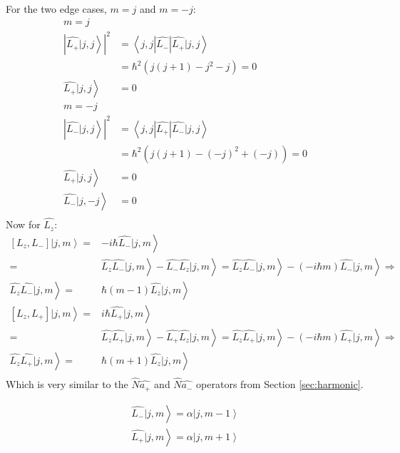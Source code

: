 		For the two edge cases, $m = j$ and $m = -j$:
		\begin{align}
			m = j& \\
			\left| \left. \hat{L_+} | j,j \right\rangle \right|^2 &= \left\langle j,j | \hat{L_-}| \hat{L_+} |j,j \right\rangle \\
			&= \hbar^2 \left( j(j+1) - j^2 - j\right) = 0 \\
			\left. \hat{L_+} | j,j \right\rangle &= 0 \\
			m = -j& \\
			\left| \left. \hat{L_-} | j,j \right\rangle \right|^2 &= \left\langle j,j | \hat{L_+}| \hat{L_-} |j,j \right\rangle \\
			&= \hbar^2 \left( j(j+1) - (-j)^2 + (-j)\right) = 0 \\
			\left. \hat{L_+} | j,j \right\rangle &= 0 \\			
			\left. \hat{L_-} | j,-j \right\rangle &= 0 \\			
		\end{align}
		Now for $\hat{L_z}$:
		\begin{align}
			\left.\left[L_z, L_-\right]|j,m\right\rangle =& \left.-i\hbar\hat{L_-}|j,m\right\rangle \\
			=& \left.\hat{L_z}\hat{L_-}|j,m\right\rangle - \left.\hat{L_-}\hat{L_z}|j,m\right\rangle = \left.\hat{L_z}\hat{L_-}|j,m\right\rangle - \left.(-i\hbar m)\hat{L_-}|j,m\right\rangle \Rightarrow \\
			\left.\hat{L_z}\hat{L_-}|j,m\right\rangle =& \left. \hbar(m-1)\hat{L_z}|j,m\right\rangle \\
			\left.\left[L_z, L_+\right]|j,m\right\rangle =& \left.i\hbar\hat{L_+}|j,m\right\rangle \\
			=& \left.\hat{L_z}\hat{L_+}|j,m\right\rangle - \left.\hat{L_+}\hat{L_z}|j,m\right\rangle = \left.\hat{L_z}\hat{L_+}|j,m\right\rangle - \left.(-i\hbar m)\hat{L_+}|j,m\right\rangle \Rightarrow \\			
			\left.\hat{L_z}\hat{L_+}|j,m\right\rangle =& \left. \hbar(m+1)\hat{L_z}|j,m\right\rangle \\			
		\end{align}
		Which is very similar to the $\hat{N}\hat{a_+}$ and $\hat{N}\hat{a_-}$ operators from Section \ref{sec:harmonic}.
		
		\begin{align}
			\left.\hat{L_-}|j,m\right\rangle = \left.\alpha|j,m-1\right\rangle \\
			\left.\hat{L_+}|j,m\right\rangle = \left.\alpha|j,m+1\right\rangle \\
		\end{align}
